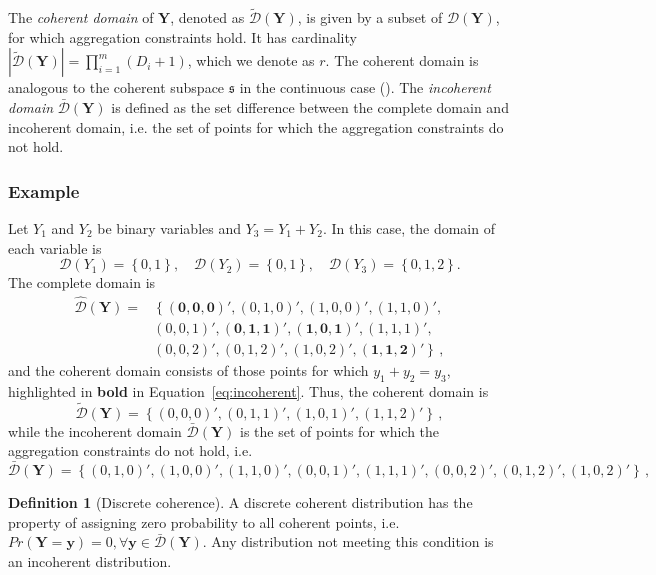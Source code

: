 \documentclass[a4paper,review,12pt,authoryear]{elsarticle}
\newcommand{\bY}{\mathbf{Y}}
\theoremstyle{definition}
\newtheorem{definition}{Definition}[section]
\begin{document}
The \textit{coherent domain} of $\bY$, denoted as $\tilde{\mathcal D}(\bY)$, is given by a subset of $\hat{\mathcal D}(\bY)$, for which aggregation constraints hold.
It has cardinality $|\tilde{\mathcal D}(\bY)|=\prod\limits_{i=1}^{m} (D_i+1)$, which we denote as $r$.
The coherent domain is analogous to the coherent subspace $\mathfrak{s}$ in the continuous case (\citealp{panagiotelisProbabilisticForecastReconciliation2022}). The \textit{incoherent domain} $\bar{\mathcal D}(\bY)$ is defined as the set difference between the complete domain and incoherent domain, i.e. the set of points for which the aggregation constraints do not hold.

  \subsubsection*{\textbf{Example}}
  \label{sec:example}

  Let $Y_1$ and $Y_2$ be binary variables and $Y_3=Y_1+Y_2$. In this case, the domain of each variable is
  \[
    \mathcal{D}(Y_1)=\left\{0,1\right\},\quad
    \mathcal{D}(Y_2)=\left\{0,1\right\},\quad
    \mathcal{D}(Y_3)=\left\{0,1,2\right\}.
  \]
  The complete domain is
  \begin{equation}
  \begin{aligned}
  \hat{\mathcal D}(\bY)=&\left\{\mathbf{(0,0,0)'},(0,1,0)',(1,0,0)',(1,1,0)',\right.\\
  &\left.(0,0,1)',\mathbf{(0,1,1)'},\mathbf{(1,0,1)'},(1,1,1)',\right.\\
  &\left.(0,0,2)',(0,1,2)',(1,0,2)',\mathbf{(1,1,2)'}\right\}\,,
  \end{aligned}
  \label{eq:incoherent}
  \end{equation}
  and the coherent domain consists of those points for which $y_1+y_2=y_3$, highlighted in \textbf{bold} in Equation~\eqref{eq:incoherent}. Thus, the coherent domain is
  \[
      \tilde{\mathcal D}(\bY)=\left\{(0,0,0)',(0,1,1)',(1,0,1)',(1,1,2)'\right\}\,,
  \]
  while the incoherent domain $\bar{\mathcal D}(\bY)$ is the set of points for which the aggregation constraints do not hold, i.e.
    \[
  \bar{\mathcal D}(\bY)=\left\{(0,1,0)',(1,0,0)',(1,1,0)',(0,0,1)',
  (1,1,1)',(0,0,2)',(0,1,2)',(1,0,2)'
  \right\}\,,
  \]
  
  \begin{definition}[Discrete coherence]
  
  A discrete coherent distribution has the property of assigning zero probability to all coherent points, i.e. $Pr(\mathbf{Y}=\bm{y})=0, \forall \bm{y}\in \bar{\mathcal D}(\bY)$. Any distribution not meeting this condition is an incoherent distribution.

  \end{definition}
\end{document}
